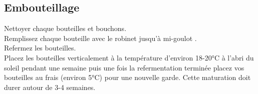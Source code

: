 \documentclass[twoside,twocolumn]{report}
\begin{document}
		\subsection{Embouteillage}
		Nettoyer chaque bouteilles et bouchons.\\
		Remplissez chaque bouteille avec le robinet  jusqu’à  mi-goulot .\\
		Refermez les  bouteilles.\\
		
		Placez les bouteilles verticalement à la température d’environ 18-20°C à l'abri du soleil pendant une semaine puis une fois la refermentation terminée placez vos bouteilles au frais (environ 5°C) pour une
		nouvelle garde. Cette maturation doit durer autour de 3-4 semaines.
		
				
				
				
			

			
				
						
		
 

	
\end{document}
